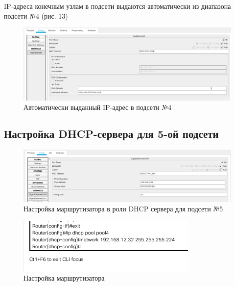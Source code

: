 \documentclass[12pt]{report}
\begin{document}
IP-адреса конечным узлам в подсети выдаются автоматически из диапазона подсети №4 (рис. 13)

\begin{figure}[H]
	\begin{center}
		\includegraphics[scale=0.4]{img/13.png}
	\end{center}
	\caption{Автоматически выданный IP-адрес в подсети №4}
	\label{fig:13}
\end{figure}

\subsection*{Настройка DHCP-сервера для 5-ой подсети}

\begin{figure}[H]
	\begin{center}
		\includegraphics[scale=0.4]{img/14.png}
	\end{center}
	\caption{Настройка маршрутизатора в роли DHCP сервера для подсети №5}
	\label{fig:14}
\end{figure}

\begin{figure}[H]
	\begin{center}
		\includegraphics[scale=0.85]{img/15.png}
	\end{center}
	\caption{Настройка маршрутизатора}
	\label{fig:15}
\end{figure}
\end{document}
